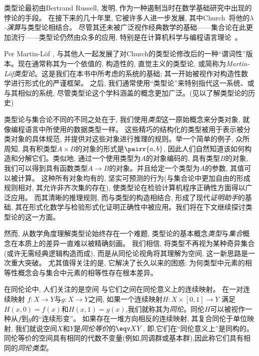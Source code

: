 类型论最初由Bertrand Russell\cite{Russell:1908}, 发明, 作为一种遏制当时在数学基础研究中出现的悖论的手段。
在接下来的几十年里, 它被许多人进一步发展, 其中Church~\cite{Church:1940tu, Church:1941tc}将他的\textit{$\lambda$-演算}与类型论相结合。
尽管其还未被广泛视作经典数学的基础——集合论在此更加流行——类型论仍然由众多的应用, 特别是在计算机科学与编程语言理论~\cite{Pierce-TAPL}。

%
%
%

Per Martin-L\"{o}f \cite{Martin-Lof-1972,Martin-Lof-1973,Martin-Lof-1979,martin-lof:bibliopolis}, 
与其他人一起发展了对Church的类型论修改后的一种``谓词性''版本。现在通常称其为一个依值的, 构造性的, 直觉主义的类型论, 
或简称为\emph{Martin\--L\"of类型论}。这是我们在本书中所考虑的系统的基础; 其一开始被视作对构造性数学进行形式化的严谨框架。
之后, 我们通常使用``类型论''来特别指代这一系统、或与其相似的系统, 尽管类型论这个学科涵盖的概念更加广泛。(见\cite{somma, kamar}以了解类型论的历史)

类型论与集合论不同的不同之处在于, 我们使用\emph{类型}这一原始概念来分类对象, 就像编程语言中所使用的数据类型一样。
这些精巧的结构化的类型被用于表示被分类对象的具体规范, 并提供对这些对象进行推理的规则。举一个简单的例子, 
众所周知, 具有积类型$A \times B$的对象的形式是$\pairr{a, b}$, 因此人们自然知道该如何构造和分解它们。类似地, 通过一个使用类型为$A$的对象编码的, 
具有类型$B$的对象, 我们可以得到具有函数类型$A \to B$的对象。并且给定一个类型为$A$的参数, 其值可以被计算。
这种所有对象均有的, 坚实可预测的行为(与集合论中更加自由的形成规则相对, 其允许非齐次集的存在), 使类型论在检验计算机程序正确性方面得以广泛应用。
而其清晰的推理规则, 而与类型的构造相结合, 形成了现代\emph{证明助手}的基础, 
%
%
其在形式化数学与检验形式化证明正确性中被应用。我们将在下文继续探讨类型论的这一方面。

然而, 从数学角度理解类型论始终存在一个难题, 类型论的基本概念\emph{类型}与\emph{集合}概念在本质上的差异一直难以被精确刻画。
我们相信, 将类型不再视为某种奇异集合(或许无需经典逻辑构造而成), 而是从同伦论视角将其理解为空间, 这一新思路是一次重大突破。
尤其值得关注的是, 它解决了长久以来的困惑: 为何类型中元素的相等性概念会与集合中元素的相等性存在根本差异。

在同伦论中, 人们关注的是空间
%
与它们之间在同伦意义上的连续映射。
%
在一对连续映射 $f : X \to Y$与$g : X\to Y$之间, 如果一个连续映射$H : X \times [0,  1] \to Y$
满足$H(x, 0) = f (x)$和$H(x, 1) = g(x)$,我们就称其为\emph{同伦}。同伦$H$可以被视作一种从$f$到$g$的``连续形变''。
%
如果存在一堆方向相反的连续映射, 其复合同伦于单位映射, 我们就说空间$X$和$Y$是\emph{同伦等价}的$\eqv X Y$,
%
即,它们在``同伦意义上''是同构的。同伦等价的空间具有相同的代数不变量(例如,同调群或基本群),因此称它们具有相同的\emph{同伦类型}。

